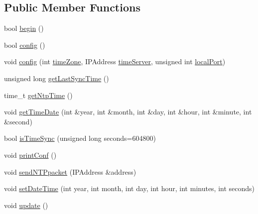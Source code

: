 \subsection*{Public Member Functions}
\begin{DoxyCompactItemize}
\item 
bool \hyperlink{classCoolTime_a2b36c4009f083ece2d407fec077c4938}{begin} ()
\item 
bool \hyperlink{classCoolTime_a87c28260c1bc77091162cbcf1ee2e129}{config} ()
\item 
void \hyperlink{classCoolTime_ae5528ed0ba9e78c711084968054950e0}{config} (int \hyperlink{classCoolTime_a1916d98810c2a4e9ba72867e8c1b9a99}{time\+Zone}, I\+P\+Address \hyperlink{classCoolTime_ad2b9858f399108cb440dd1e908916f04}{time\+Server}, unsigned int \hyperlink{classCoolTime_a2f777da44d7ba678be8185299e9b49d1}{local\+Port})
\item 
unsigned long \hyperlink{classCoolTime_a5d17f707a9d337720493b2bce9d41c21}{get\+Last\+Sync\+Time} ()
\item 
time\+\_\+t \hyperlink{classCoolTime_a41fbbbfd651c2079f54d4b2911e4c705}{get\+Ntp\+Time} ()
\item 
void \hyperlink{classCoolTime_a52a1503ad5cb540c71c44cfeceaead8a}{get\+Time\+Date} (int \&year, int \&month, int \&day, int \&hour, int \&minute, int \&second)
\item 
bool \hyperlink{classCoolTime_a5ae038a4498602b189f76a10bf02adf8}{is\+Time\+Sync} (unsigned long seconds=604800)
\item 
void \hyperlink{classCoolTime_af355e7f9b3898211cd2ff25eab5933b1}{print\+Conf} ()
\item 
void \hyperlink{classCoolTime_a236a38d120dc53bc67456d763838c5a1}{send\+N\+T\+Ppacket} (I\+P\+Address \&address)
\item 
void \hyperlink{classCoolTime_ab81ea7fdaace111aa01cc1ec84c6d297}{set\+Date\+Time} (int year, int month, int day, int hour, int minutes, int seconds)
\item 
void \hyperlink{classCoolTime_aae601f795452cfa48d9fb337aed483a8}{update} ()
\end{DoxyCompactItemize}
